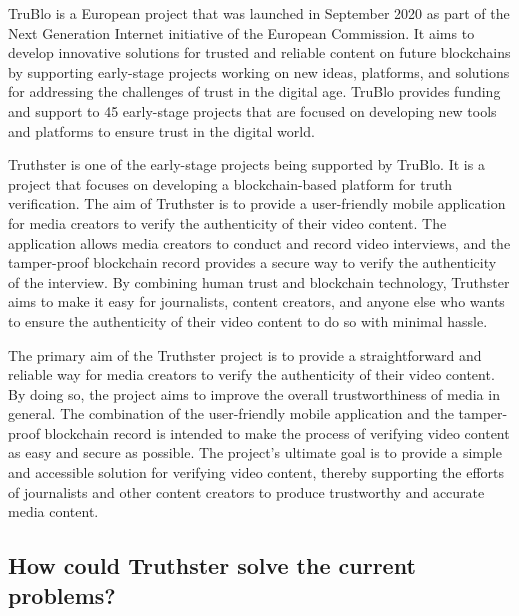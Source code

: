 \documentclass[target=mst,aauheader=]{thud}
\begin{document}
TruBlo is a European project that was launched in September 2020 as part of the Next Generation Internet initiative of the European Commission. It aims to develop innovative solutions for trusted and reliable content on future blockchains by supporting early-stage projects working on new ideas, platforms, and solutions for addressing the challenges of trust in the digital age. TruBlo provides funding and support to 45 early-stage projects \cite{trublo} that are focused on developing new tools and platforms to ensure trust in the digital world.\par
Truthster is one of the early-stage projects being supported by TruBlo. It is a project that focuses on developing a blockchain-based platform for truth verification. The aim of Truthster is to provide a user-friendly mobile application for media creators to verify the authenticity of their video content. The application allows media creators to conduct and record video interviews, and the tamper-proof blockchain record provides a secure way to verify the authenticity of the interview. By combining human trust and blockchain technology, Truthster aims to make it easy for journalists, content creators, and anyone else who wants to ensure the authenticity of their video content to do so with minimal hassle.\par
The primary aim of the Truthster project is to provide a straightforward and reliable way for media creators to verify the authenticity of their video content. By doing so, the project aims to improve the overall trustworthiness of media in general. The combination of the user-friendly mobile application and the tamper-proof blockchain record is intended to make the process of verifying video content as easy and secure as possible. The project's ultimate goal is to provide a simple and accessible solution for verifying video content, thereby supporting the efforts of journalists and other content creators to produce trustworthy and accurate media content.

\subsection{How could Truthster solve the current problems?}
\end{document}
